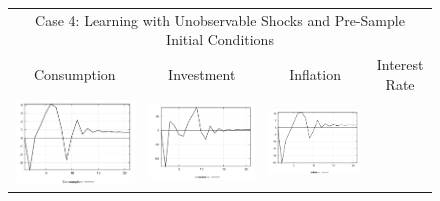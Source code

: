 \begin{figure}
\begin{tabular}{cccc}
\multicolumn{4}{c}{Case 4: Learning with Unobservable Shocks and Pre-Sample Initial Conditions}\\
Consumption & Investment & Inflation & Interest Rate \\ 
\includegraphics[scale=0.22]{results_wlsinit/Consumption_invshock_irf.png} & 
\includegraphics[scale=0.22]{results_wlsinit/Investment_invshock_irf.png} & 
\includegraphics[scale=0.22]{results_wlsinit/Inflation_invshock_irf.png} & 

\end{tabular}
\end{figure}

